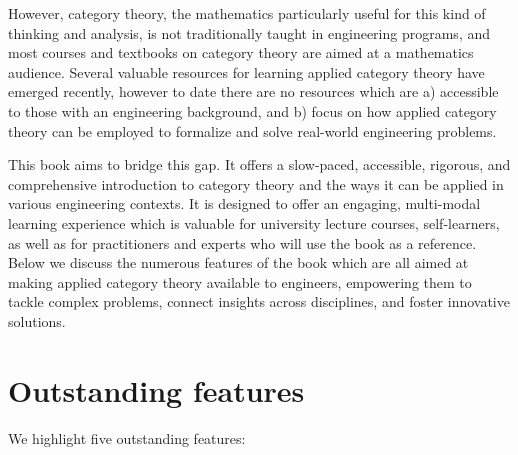 \documentclass[10pt, article, one side]{memoir}
\begin{document}
    However, category theory, the mathematics particularly useful for this kind of thinking and analysis, is not traditionally taught in engineering programs, and most courses and textbooks on category theory are aimed at a mathematics audience.
    Several valuable resources for learning applied category theory have emerged recently, however to date there are no resources which are a) accessible to those with an engineering background, and b) focus on how applied category theory can be employed to formalize and solve real-world engineering problems.

    This book aims to bridge this gap.
    It offers a slow-paced, accessible, rigorous, and comprehensive introduction to category theory and the ways it can be applied in various engineering contexts.
    It is designed to offer an engaging, multi-modal learning experience which is valuable for university lecture courses, self-learners, as well as for practitioners and experts who will use the book as a reference.
    Below we discuss the numerous features of the book which are all aimed at making applied category theory available to engineers, empowering them to tackle complex problems, connect insights across disciplines, and foster innovative solutions.

    \section{Outstanding features}
    We highlight five outstanding features:
\end{document}
